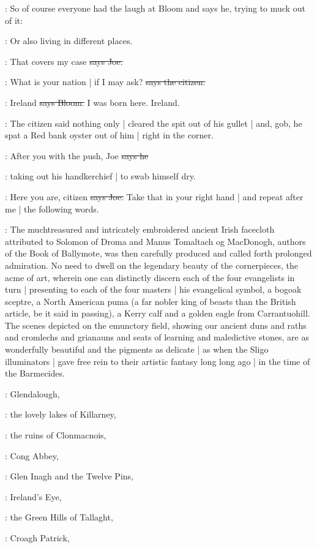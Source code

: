 \Nq:
So of course everyone had the laugh at Bloom and says he,
trying to muck out of it:

\Bloom:
Or also living in different places.

\joe:
That covers my case
\sout{says Joe.}

\citizen:
What is your nation |
if I may ask?
\sout{says the citizen.}

\Bloom:
Ireland
\sout{says Bloom.}
I was born here.
Ireland.

\Nq:
The citizen said nothing only |
cleared the spit out of his gullet |
and,
gob,
he spat a Red bank oyster out of him |
right in the corner.

\citizen:
After you with the push,
Joe
\sout{says he}

\Nq:
taking out his handkerchief |
to swab himself dry.

\joe:
Here you are,
citizen
\sout{says Joe.}
Take that in your right hand |
and repeat after me |
the following words.

:
The muchtreasured and intricately embroidered ancient Irish
facecloth attributed to Solomon of Droma and Manus Tomaltach og MacDonogh,
authors of the Book of Ballymote,
was then carefully produced and called forth prolonged admiration.
No need to dwell on the legendary beauty of the cornerpieces,
the acme of art,
wherein one can distinctly discern each of the four evangelists in turn |
presenting to each of the four masters |
his evangelical symbol,
a bogoak sceptre,
a North American puma
(a far nobler king of beasts than the British article,
be it said in passing),
a Kerry calf and a golden eagle from Carrantuohill.
The scenes depicted on the emunctory field,
showing our ancient duns and raths
and cromlechs and grianauns and seats of learning and maledictive stones,
are as wonderfully beautiful and the pigments as delicate |
as when the Sligo illuminators |
gave free rein to their artistic fantasy
long long ago |
in the time of the Barmecides.

:
Glendalough,

:
the lovely lakes of Killarney,

:
the ruins of Clonmacnois,

:
Cong Abbey,

:
Glen Inagh and the Twelve Pins,

:
Ireland's Eye,

:
the Green Hills of Tallaght,

:
Croagh Patrick,

